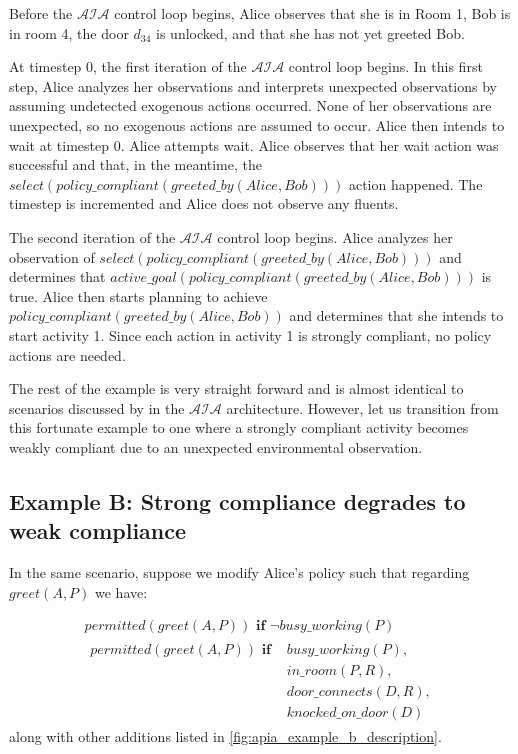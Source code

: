 Before the $\mathcal{AIA}$ control loop begins, Alice observes that she is in Room 1, Bob is in room 4, the door $d_{34}$ is unlocked, and that she has not yet greeted Bob.

At timestep 0, the first iteration of the $\mathcal{AIA}$ control loop begins.
In this first step, Alice analyzes her observations and interprets unexpected observations by assuming undetected exogenous actions occurred.
None of her observations are unexpected, so no exogenous actions are assumed to occur.
Alice then intends to wait at timestep 0.
Alice attempts wait.
Alice observes that her wait action was successful and that, in the meantime, the $select(policy\_compliant(greeted\_by(Alice, Bob)))$ action happened.
The timestep is incremented and Alice does not observe any fluents.

The second iteration of the $\mathcal{AIA}$ control loop begins.
Alice analyzes her observation of $select(policy\_compliant(greeted\_by(Alice, Bob)))$ and determines that $active\_goal(policy\_compliant(greeted\_by(Alice, Bob)))$ is true.
Alice then starts planning to achieve $policy\_compliant(greeted\_by(Alice, Bob))$ and determines that she intends to start activity 1.
Since each action in activity 1 is strongly compliant, no policy actions are needed.

The rest of the example is very straight forward and is almost identical to scenarios discussed by \citet{blount_architecture_2013,blount_towards_2014} in the $\mathcal{AIA}$ architecture.
However, let us transition from this fortunate example to one where a strongly compliant activity becomes weakly compliant due to an unexpected environmental observation.

\subsection{Example B: Strong compliance degrades to weak compliance}

In the same scenario, suppose we modify Alice's policy such that regarding $greet(A, P)$ we have:

\begin{gather}
    \label{eq:apia_example_b_permitted_greet}
    permitted(greet(A, P)) \textbf{ if }
        \neg busy\_working(P) \\
    \begin{split}
        permitted(greet(A, P)) \textbf{ if }
            & busy\_working(P), \\
            & in\_room(P, R), \\
            & door\_connects(D, R), \\
            & knocked\_on\_door(D)
    \end{split}
\end{gather}
along with other additions listed in \cref{fig:apia_example_b_description}.


